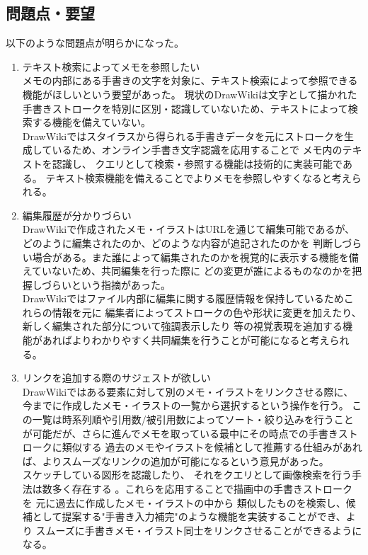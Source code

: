 \subsection{問題点・要望}
以下のような問題点が明らかになった。
\begin{enumerate}
    \item テキスト検索によってメモを参照したい\\
    メモの内部にある手書きの文字を対象に、テキスト検索によって参照できる機能がほしいという要望があった。
    現状のDrawWikiは文字として描かれた手書きストロークを特別に区別・認識していないため、テキストによって検索する機能を備えていない。
    \\
    DrawWikiではスタイラスから得られる手書きデータを元にストロークを生成しているため、オンライン手書き文字認識を応用することで
    メモ内のテキストを認識し、 クエリとして検索・参照する機能は技術的に実装可能である。
    テキスト検索機能を備えることでよりメモを参照しやすくなると考えられる。
    \item 編集履歴が分かりづらい\\
    DrawWikiで作成されたメモ・イラストはURLを通じて編集可能であるが、どのように編集されたのか、どのような内容が追記されたのかを
    判断しづらい場合がある。また誰によって編集されたのかを視覚的に表示する機能を備えていないため、共同編集を行った際に
    どの変更が誰によるものなのかを把握しづらいという指摘があった。
    \\
    DrawWikiではファイル内部に編集に関する履歴情報を保持しているためこれらの情報を元に
    編集者によってストロークの色や形状に変更を加えたり、新しく編集された部分について強調表示したり
    等の視覚表現を追加する機能があればよりわかりやすく共同編集を行うことが可能になると考えられる。
    \item リンクを追加する際のサジェストが欲しい\\
    DrawWikiではある要素に対して別のメモ・イラストをリンクさせる際に、今までに作成したメモ・イラストの一覧から選択するという操作を行う。
    この一覧は時系列順や引用数/被引用数によってソート・絞り込みを行うことが可能だが、さらに進んでメモを取っている最中にその時点での手書きストロークに類似する
    過去のメモやイラストを候補として推薦する仕組みがあれば、よりスムーズなリンクの追加が可能になるという意見があった。
    \\
    スケッチしている図形を認識したり\cite{Notowidigdo2004OfflineSI}\cite{Wobbrock2007GesturesWL}、
    それをクエリとして画像検索を行う手法は数多く存在する\cite{Eitz2012SketchbasedSR}\cite{Eitz2011PhotosketcherIS}
    \cite{Chen2009Sketch2PhotoII}。これらを応用することで描画中の手書きストロークを 元に過去に作成したメモ・イラストの中から
    類似したものを検索し、候補として提案する"手書き入力補完"のような機能を実装することができ、より
    スムーズに手書きメモ・イラスト同士をリンクさせることができるようになる。
\end{enumerate}

